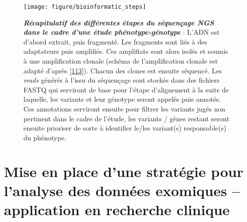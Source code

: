 \documentclass[12pt,a4paper,twoside]{ugathesis}
\theoremstyle{definition}
\theoremstyle{definition}
\theoremstyle{definition}
\theoremstyle{remark}
\begin{document}
\newpage 

\begin{figure}

{\centering \texttt{[image: figure/bioinformatic\_steps]} 

}

\caption[Récapitulatif des différentes étapes du séquençage NGS dans le cadre d'une étude phénotype-génotype]{\textbf{\emph{Récapitulatif des différentes
étapes du séquençage NGS dans le cadre d'une étude phénotype-génotype}}
: L'ADN est d'abord extrait, puis fragmenté. Les fragments sont liés à
des adaptateurs puis amplifiés. Ces amplifiats sont alors isolés et
soumis à une amplification clonale (schéma de l'amplification clonale
est adapté d'après {[}\protect\hyperlink{ref-Goodwin2016}{113}{]}).
Chacun des clones est ensuite séquencé. Les \emph{reads} générés à
l'issu du séquençage sont stockés dans des fichiers FASTQ qui serviront
de base pour l'étape d'alignement à la suite de laquelle, les variants
et leur génotype seront appelés puis annotés. Ces annotations serviront
ensuite pour filtrer les variants jugés non pertinent dans le cadre de
l'étude, les variants / gènes restant seront ensuite prioriser de sorte
à identifier le/les variant(s) responsable(s) du phénotype.}\label{fig:pictrecapngssteps}
\end{figure}















\chapter{Mise en place d'une stratégie pour l'analyse des données
exomiques -- application en recherche
clinique}\label{mise-en-place-dune-strategie-pour-lanalyse-des-donnees-exomiques-application-en-recherche-clinique}

\newpage
\end{document}
